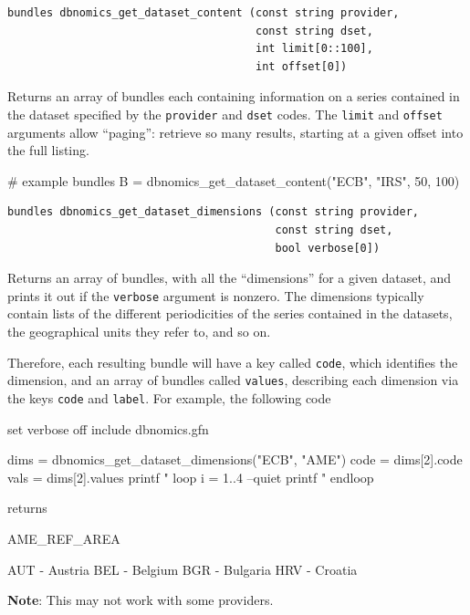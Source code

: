 \documentclass{article}
\begin{document}
\begin{funcdoc}
\begin{verbatim}
bundles dbnomics_get_dataset_content (const string provider,
                                      const string dset,
                                      int limit[0::100],
                                      int offset[0])
\end{verbatim}
Returns an array of bundles each containing information on a series
contained in the dataset specified by the \texttt{provider} and
\texttt{dset} codes. The \texttt{limit} and \texttt{offset}
arguments allow ``paging'': retrieve so many results, starting at a
given offset into the full listing.
\begin{code}
# example
bundles B = dbnomics_get_dataset_content("ECB", "IRS", 50, 100)
\end{code}
\end{funcdoc}


\begin{funcdoc}
\begin{verbatim}
bundles dbnomics_get_dataset_dimensions (const string provider,
                                         const string dset,
                                         bool verbose[0])
\end{verbatim}
Returns an array of bundles, with all the ``dimensions'' for a given
dataset, and prints it out if the \texttt{verbose} argument is
nonzero. The dimensions typically contain lists of the different
periodicities of the series contained in the datasets, the
geographical units they refer to, and so on.

Therefore, each resulting bundle will have a key called \texttt{code},
which identifies the dimension, and an array of bundles called
\texttt{values}, describing each dimension via the keys \texttt{code}
and \texttt{label}. For example, the following code
\begin{code}
set verbose off
include dbnomics.gfn

dims = dbnomics_get_dataset_dimensions("ECB", "AME")
code = dims[2].code
vals = dims[2].values
printf "%
loop i = 1..4 --quiet
    printf "%
endloop
\end{code}

returns

\begin{code}
AME_REF_AREA

AUT - Austria
BEL - Belgium
BGR - Bulgaria
HRV - Croatia
\end{code}

\textbf{Note}: This may not work with some providers.
\end{funcdoc}
\end{document}
